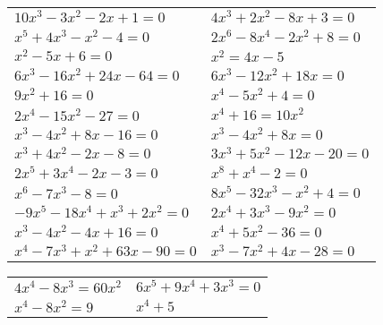 \documentclass[12pt,a4paper]{article}
\begin{document}
\begin{enumerate}[1.]
\begin{enumerate}[1)]
\begin{tabular}{p{7cm} p{7cm}}
				\item $10x^3-3x^2-2x+1=0$		& \item $4x^3+2x^2-8x+3=0$ \\
				\item $x^5+4x^3-x^2-4=0$		& \item $2x^6-8x^4-2x^2+8=0$ \\
				\item $x^2-5x+6=0$ 				& \item $x^2=4x-5$\\
				\item $6x^3-16x^2+24x-64=0$ 		& \item $6x^3-12x^2+18x=0$\\
				\item $9x^2+16=0$				& \item $x^4-5x^2+4=0$\\
				\item $2x^4-15x^2-27=0 $ 		& \item $x^4+16=10x^2$\\
				\item $x^3-4x^2+8x-16=0 $ 		& \item $x^3-4x^2+8x=0$\\
				\item $x^3+4x^2-2x-8=0 $ 		& \item $3x^3+5x^2-12x-20=0$\\
				\item $2x^5+3x^4-2x-3=0 $ 		& \item $x^8+x^4-2=0$\\
				\item $x^6-7x^3-8=0 $ 			& \item $8x^5-32x^3-x^2+4=0$\\
				\item $-9x^5-18x^4+x^3+2x^2=0 $ & \item $2x^4+3x^3-9x^2=0$\\
				\item $x^3-4x^2-4x+16=0$ 		& \item $x^4+5x^2-36=0$\\
				\item $x^4-7x^3+x^2+63x-90=0$ 	& \item $x^3 - 7x^2 + 4x - 28 = 0$\\ \end{tabular} \end{enumerate}
			
			
				\begin{enumerate}[1)] \begin{tabular}{p{7cm} p{7cm}} 
				\item $4x^4-8x^3=60x^2$ 	& \vspace{0.4cm}\item $6x^5+9x^4+3x^3=0 $\\
				\item $x^4-8x^2=9 $ 	& \item $x^4+5$\\
				\end{tabular} \end{enumerate}
	\end{enumerate}
\end{document}
